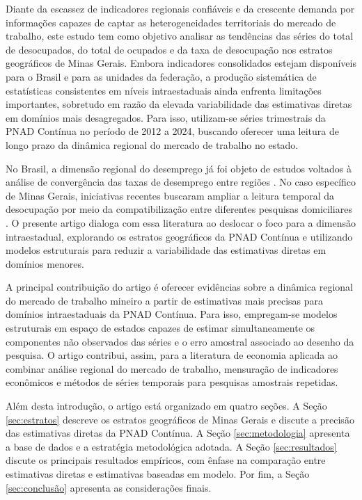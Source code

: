 \documentclass[rbe,wwwview]{econbr}
\begin{document}
Diante da escassez de indicadores regionais confiáveis e da crescente demanda por informações capazes de captar as heterogeneidades territoriais do mercado de trabalho, este estudo tem como objetivo analisar as tendências das séries do total de desocupados, do total de ocupados e da taxa de desocupação nos estratos geográficos de Minas Gerais. Embora indicadores consolidados estejam disponíveis para o Brasil e para as unidades da federação, a produção sistemática de estatísticas consistentes em níveis intraestaduais ainda enfrenta limitações importantes, sobretudo em razão da elevada variabilidade das estimativas diretas em domínios mais desagregados. Para isso, utilizam-se séries trimestrais da PNAD Contínua no período de 2012 a 2024, buscando oferecer uma leitura de longo prazo da dinâmica regional do mercado de trabalho no estado.

No Brasil, a dimensão regional do desemprego já foi objeto de estudos voltados à análise de convergência das taxas de desemprego entre regiões \citep{ferrari2015}. No caso específico de Minas Gerais, iniciativas recentes buscaram ampliar a leitura temporal da desocupação por meio da compatibilização entre diferentes pesquisas domiciliares \citep{marques2024}. O presente artigo dialoga com essa literatura ao deslocar o foco para a dimensão intraestadual, explorando os estratos geográficos da PNAD Contínua e utilizando modelos estruturais para reduzir a variabilidade das estimativas diretas em domínios menores.

A principal contribuição do artigo é oferecer evidências sobre a dinâmica regional do mercado de trabalho mineiro a partir de estimativas mais precisas para domínios intraestaduais da PNAD Contínua. Para isso, empregam-se modelos estruturais em espaço de estados capazes de estimar simultaneamente os componentes não observados das séries e o erro amostral associado ao desenho da pesquisa. O artigo contribui, assim, para a literatura de economia aplicada ao combinar análise regional do mercado de trabalho, mensuração de indicadores econômicos e métodos de séries temporais para pesquisas amostrais repetidas.

Além desta introdução, o artigo está organizado em quatro seções. A Seção \ref{sec:estratos} descreve os estratos geográficos de Minas Gerais e discute a precisão das estimativas diretas da PNAD Contínua. A Seção \ref{sec:metodologia} apresenta a base de dados e a estratégia metodológica adotada. A Seção \ref{sec:resultados} discute os principais resultados empíricos, com ênfase na comparação entre estimativas diretas e estimativas baseadas em modelo. Por fim, a Seção \ref{sec:conclusão} apresenta as considerações finais.
\end{document}
